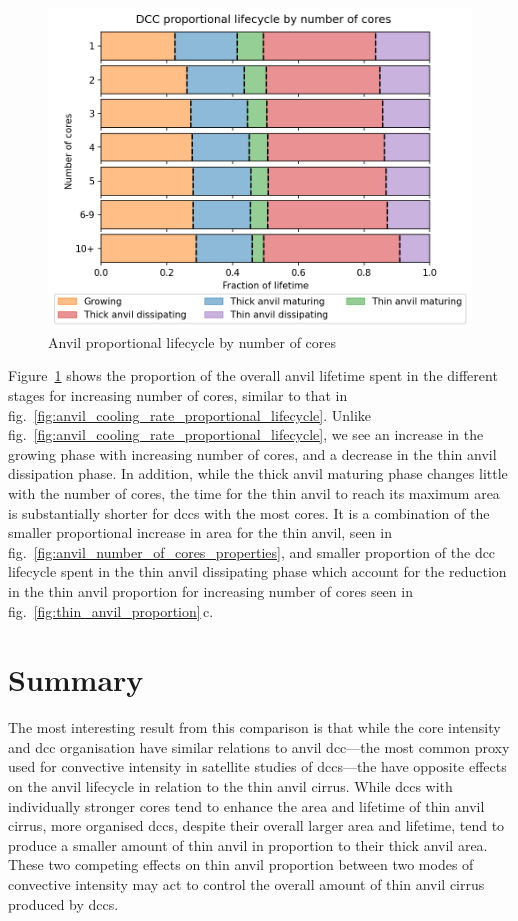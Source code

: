 \begin{figure}[tp]
    \centering
    \includegraphics[width=\textwidth]{figures/ch2_26.png}
    \caption{Anvil proportional lifecycle by number of cores}
    \label{fig:anvil_number_of_cores_proportional_lifecycle}
\end{figure}

Figure~\ref{fig:anvil_number_of_cores_proportional_lifecycle} shows the proportion of the overall anvil lifetime spent in the different stages for increasing number of cores, similar to that in fig.~\ref{fig:anvil_cooling_rate_proportional_lifecycle}.
Unlike fig.~\ref{fig:anvil_cooling_rate_proportional_lifecycle}, we see an increase in the growing phase with increasing number of cores, and a decrease in the thin anvil dissipation phase.
In addition, while the thick anvil maturing phase changes little with the number of cores, the time for the thin anvil to reach its maximum area is substantially shorter for \acrshort{dcc}s with the most cores.
It is a combination of the smaller proportional increase in area for the thin anvil, seen in fig.~\ref{fig:anvil_number_of_cores_properties}, and smaller proportion of the \acrshort{dcc} lifecycle spent in the thin anvil dissipating phase which account for the reduction in the thin anvil proportion for increasing number of cores seen in fig.~\ref{fig:thin_anvil_proportion}\,c.

\section{Summary}

The most interesting result from this comparison is that while the core intensity and \acrshort{dcc} organisation have similar relations to anvil \acrshort{dcc}---the most common proxy used for convective intensity in satellite studies of \acrshort{dcc}s---the have opposite effects on the anvil lifecycle in relation to the thin anvil cirrus.
While \acrshort{dcc}s with individually stronger cores tend to enhance the area and lifetime of thin anvil cirrus, more organised \acrshort{dcc}s, despite their overall larger area and lifetime, tend to produce a smaller amount of thin anvil in proportion to their thick anvil area.
These two competing effects on thin anvil proportion between two modes of convective intensity may act to control the overall amount of thin anvil cirrus produced by \acrshort{dcc}s.
